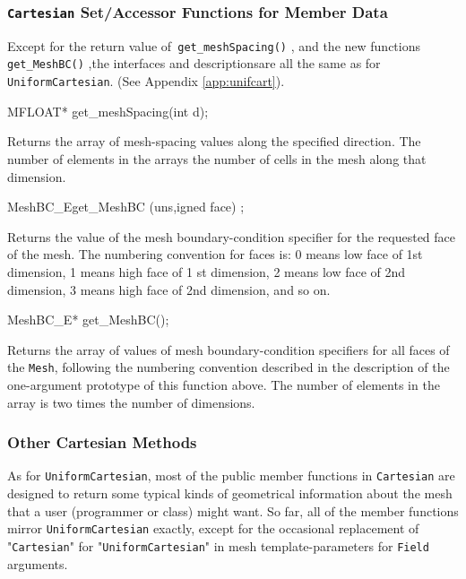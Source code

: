 \subsubsection{\texttt{Cartesian} Set/Accessor Functions for Member Data}
Except for the return value of\texttt{ get\_meshSpacing()} , and the new functions \texttt{get\_MeshBC()} ,the interfaces and descriptionsare all the same as for\\  \texttt{UniformCartesian}. (See Appendix \ref{app:unifcart}).
\begin{smallcode}
MFLOAT* get_meshSpacing(int d);
\end{smallcode}
Returns the array of mesh-spacing values along the specified direction. The number of elements in the arrays the number of cells in the mesh along that dimension. 
\begin{smallcode}
MeshBC_Eget_MeshBC (uns,igned face) ;
\end{smallcode}
Returns the value of the mesh boundary-condition specifier for the requested face of the mesh. The numbering convention for faces is: 0 means low face of 1st dimension, 1 means high face of 1 st dimension, 
2 means low face of 2nd dimension, 3 means high face of 2nd dimension, and so on. 
\begin{smallcode}
MeshBC_E* get_MeshBC(); 
\end{smallcode}
Returns the array of values of mesh boundary-condition specifiers for all faces of the \texttt{Mesh}, following the numbering convention described in the description of the one-argument prototype 
of this function above. The number of elements in the array is two times the number of dimensions. 
 
\subsubsection{Other Cartesian Methods} 
As for \texttt{UniformCartesian}, most of the public member functions in \texttt{Cartesian} are designed to return some typical kinds of geometrical information about  the mesh that a user (programmer or class) 
might want. So far, all of the member functions mirror \texttt{UniformCartesian} exactly, except for the occasional replacement of \\  "\texttt{Cartesian}" for 
"\texttt{UniformCartesian}" in mesh template-parameters for \texttt{Field} arguments.









